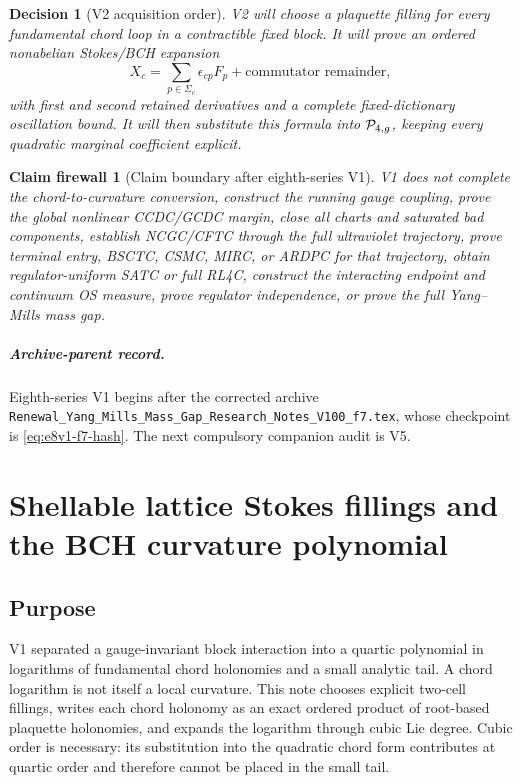 \documentclass[11pt,oneside]{book}
\newtheorem{firewall}[theorem]{Claim firewall}
\newtheorem{decision}[theorem]{Decision}
\theoremstyle{definition}
\theoremstyle{remark}
\begin{document}
\begin{decision}[V2 acquisition order]
\label{dec:e8v1-V2}
V2 will choose a plaquette filling for every fundamental chord loop in
a contractible fixed block.  It will prove an ordered nonabelian
Stokes/BCH expansion
\[
 X_c=\sum_{p\in\Sigma_c}\epsilon_{cp}F_p+
 \text{commutator remainder},
\]
with first and second retained derivatives and a complete
fixed-dictionary oscillation bound.  It will then substitute this
formula into \({\cal P}_{4,g}\), keeping every quadratic marginal
coefficient explicit.
\end{decision}

\begin{firewall}[Claim boundary after eighth-series V1]
\label{fire:e8v1-claim}
V1 does not complete the chord-to-curvature conversion, construct the
running gauge coupling, prove the global nonlinear CCDC/GCDC margin,
close all charts and saturated bad components, establish NCGC/CFTC
through the full ultraviolet trajectory, prove terminal entry, BSCTC,
CSMC, MIRC, or ARDPC for that trajectory, obtain regulator-uniform
SATC or full RL4C, construct the interacting endpoint and continuum OS
measure, prove regulator independence, or prove the full Yang--Mills
mass gap.
\end{firewall}

\paragraph{Archive-parent record.}
Eighth-series V1 begins after the corrected archive
\texttt{Renewal\_Yang\_Mills\_Mass\_Gap\_Research\_Notes\_V100\_f7.tex},
whose checkpoint is \eqref{eq:e8v1-f7-hash}.  The next compulsory
companion audit is V5.

\clearpage

\chapter{Shellable lattice Stokes fillings and the BCH curvature
polynomial}
\label{ch:e8v2}

\section{Purpose}
\label{sec:e8v2-purpose}

V1 separated a gauge-invariant block interaction into a quartic
polynomial in logarithms of fundamental chord holonomies and a small
analytic tail.  A chord logarithm is not itself a local curvature.
This note chooses explicit two-cell fillings, writes each chord
holonomy as an exact ordered product of root-based plaquette
holonomies, and expands the logarithm through cubic Lie degree.  Cubic
order is necessary: its substitution into the quadratic chord form
contributes at quartic order and therefore cannot be placed in the
small tail.
\end{document}
